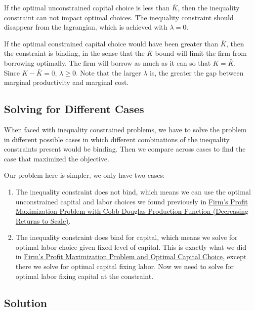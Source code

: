 \documentclass[
]{book}
\begin{document}
If the optimal unconstrained capital choice is less than \(\bar{K}\), then
the inequality constraint can not impact optimal choices. The inequality
constraint should disappear from the lagrangian, which is achieved with
\(\lambda =0\).

If the optimal constrained capital choice would have been greater than
\(\bar{K}\), then the constraint is binding, in the sense that the
\(\bar{K}\) bound will limit the firm from borrowing optimally. The firm
will borrow as much as it can so that \(K=\bar{K}\). Since \(K-\bar{K} =0\),
\(\lambda \ge 0\). Note that the larger \(\lambda\) is, the greater the gap
between marginal productivity and marginal cost.

\hypertarget{solving-for-different-cases}{%
\subsection{Solving for Different Cases}\label{solving-for-different-cases}}

When faced with inequality constrained problems, we have to solve the
problem in different possible cases in which different combinations of
the inequality constraints present would be binding. Then we compare
across cases to find the case that maximized the objective.

Our problem here is simpler, we only have two cases:

\begin{enumerate}
\def\labelenumi{\arabic{enumi}.}
\item
  The inequality constraint does not bind, which means we can use the
  optimal unconstrained capital and labor choices we found previously
  in \href{https://math4econ.github.io/matrix_application/KL_borrowhire_firm.html}{Firm's Profit Maximization Problem with Cobb Douglas Production
  Function (Decreasing Returns to
  Scale)}.
\item
  The inequality constraint does bind for capital, which means we
  solve for optimal labor choice given fixed level of capital. This is
  exactly what we did in \href{https://math4econ.github.io/derivative_application/K_borrow_firm.html}{Firm's Profit Maximization Problem and
  Optimal Capital
  Choice},
  except there we solve for optimal capital fixing labor. Now we need
  to solve for optimal labor fixing capital at the constraint.
\end{enumerate}

\hypertarget{solution}{%
\subsection{Solution}\label{solution}}
\end{document}
